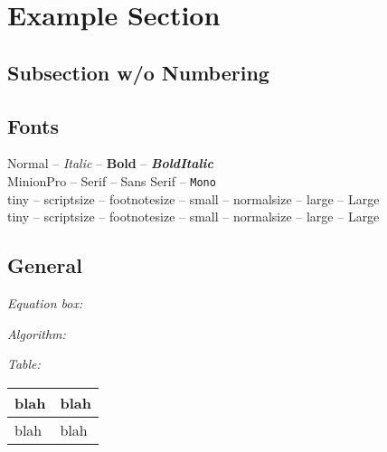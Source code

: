 \section{Example Section}

\subsection*{Subsection w/o Numbering}

\subsection{Fonts}

Normal --
\textit{Italic} -- %
\textbf{Bold} -- %
\textbf{\textit{BoldItalic}}
\\
{\minionpro MinionPro} --
\textrm{Serif} -- %
\textsf{Sans Serif} -- %
\texttt{Mono} %
\\
{\tiny tiny} --
{\scriptsize scriptsize} --
{\footnotesize footnotesize} --
{\small small} --
{\normalsize normalsize} --
{\large large} --
{\Large Large} %
\\
\begingroup%
\tiny tiny --
\scriptsize scriptsize --
\footnotesize footnotesize --
\small small --
\normalsize normalsize --
\large large --
\Large Large %
\endgroup


\subsection{General}

\emph{Equation box:}\\

\emph{Algorithm:}\\

\emph{Table:}\\
{
\def\arraystretch{1.2}
\begin{tabularx}{\linewidth}{XX}
    \toprule
    blah & blah \\
    \midrule
    blah & blah \\
    \bottomrule
\end{tabularx}
}
